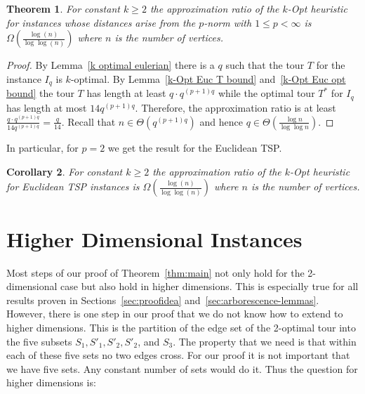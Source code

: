 \documentclass[a4paper, 11pt]{article}
\newtheorem{theorem}{Theorem}
\newtheorem{corollary}[theorem]{Corollary}
\def\blue#1{#1}
\begin{document}
\begin{theorem}
For constant $k\ge 2$ the approximation ratio of the $k$-Opt heuristic for instances whose distances arise from the $p$-norm \blue{with $1\le p < \infty$} is $\Omega\left(\frac{\log(n)}{\log\log(n)}\right)$ where $n$ is the number of vertices.
\label{thm:LowerBoundLp}
\end{theorem}

\begin{proof}
By Lemma~\ref{k optimal eulerian} there is a $q$ such that the tour $T$ for the instance $I_q$ is $k$-optimal. By Lemma~\ref{k-Opt Euc T bound} and~\ref{k-Opt Euc opt bound} the tour $T$ has length at least $q\cdot q^{(p+1)q}$ while the optimal tour $T^*$ for $I_q$ has length at most $14q^{(p+1)q}$. Therefore, the approximation ratio is at least $\frac{q\cdot q^{(p+1)q}}{14q^{(p+1)q}}=\frac{q}{14}$. Recall that $n\in\Theta\left(q^{(p+1)q}\right)$ and hence $q\in\Theta\left(\frac{\log n}{\log \log n}\right)$. 
\end{proof}

In particular, for $p=2$ we get the result for the Euclidean TSP.

\begin{corollary}
For constant $k\ge 2$ the approximation ratio of the $k$-Opt heuristic for Euclidean TSP instances is $\Omega\left(\frac{\log(n)}{\log\log(n)}\right)$ where $n$ is the number of vertices.
\end{corollary}




















\section{Higher Dimensional Instances}  
\label{sec:higherDimension}

Most steps of our proof of Theorem~\blue{\ref{thm:main}} not only hold for the 2-dimensional case but also hold in higher dimensions. This is especially true for all results proven in \blue{Sections~\ref{sec:proofidea} and~\ref{sec:arborescence-lemmas}}.
However, there is one step in our proof that we do not know how to extend to higher dimensions. This is the partition of the edge set of the 2-optimal tour into the five subsets $S_1, S'_1, S'_2, S'_2$, and $S_3$. The property that we need is that within each of these five sets no two edges cross. For our proof it is not important that we have five sets. Any constant number of sets would do it. Thus the question for higher dimensions is: 
\end{document}

